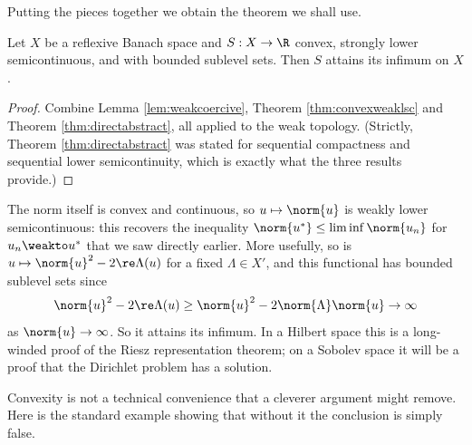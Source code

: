 Putting the pieces together we obtain the theorem we shall use.

\begin{corollary}\label{cor:directconvex}
	Let $X$ be a reflexive Banach space and $S : X \to \R$ convex, strongly lower semicontinuous, and with bounded sublevel sets. Then $S$ attains its infimum on $X$.
\end{corollary}

\begin{proof}
	Combine Lemma \ref{lem:weakcoercive}, Theorem \ref{thm:convexweaklsc} and Theorem \ref{thm:directabstract}, all applied to the weak topology. (Strictly, Theorem \ref{thm:directabstract} was stated for sequential compactness and sequential lower semicontinuity, which is exactly what the three results provide.)
\end{proof}

\begin{example}
	The norm itself is convex and continuous, so $u \mapsto \norm{u}$ is weakly lower semicontinuous: this recovers the inequality $\norm{u^*}\le\liminf\norm{u_n}$ for $u_n \weakto u^*$ that we saw directly earlier. More usefully, so is $u \mapsto \norm{u}^2 - 2\re\Lambda(u)$ for a fixed $\Lambda \in X'$, and this functional has bounded sublevel sets since
	$$\norm{u}^2 - 2\re\Lambda(u) \ge \norm{u}^2 - 2\norm{\Lambda}\norm{u} \to \infty$$
	as $\norm{u}\to\infty$. So it attains its infimum. In a Hilbert space this is a long-winded proof of the Riesz representation theorem; on a Sobolev space it will be a proof that the Dirichlet problem has a solution.
\end{example}

Convexity is not a technical convenience that a cleverer argument might remove. Here is the standard example showing that without it the conclusion is simply false.

